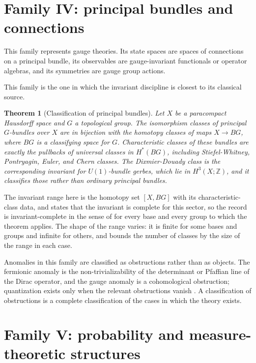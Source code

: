 \documentclass[11pt,letterpaper]{article}
\newtheorem{theorem}{Theorem}[section]
\theoremstyle{definition}
\theoremstyle{remark}
\begin{document}
\section{Family IV: principal bundles and connections}
\label{sec:family4}

This family represents gauge theories. Its state spaces are spaces of connections on a principal bundle, its observables are gauge-invariant functionals or operator algebras, and its symmetries are gauge group actions.

This family is the one in which the invariant discipline is closest to its classical source.

\begin{theorem}[Classification of principal bundles]
\label{thm:bundles}
Let $X$ be a paracompact Hausdorff space and $G$ a topological group. The isomorphism classes of principal $G$-bundles over $X$ are in bijection with the homotopy classes of maps $X \to BG$, where $BG$ is a classifying space for $G$. Characteristic classes of these bundles are exactly the pullbacks of universal classes in $H^*(BG)$, including Stiefel-Whitney, Pontryagin, Euler, and Chern classes. The Dixmier-Douady class is the corresponding invariant for $U(1)$-bundle gerbes, which lie in $H^3(X; \mathbb{Z})$, and it classifies those rather than ordinary principal bundles.
\end{theorem}

The invariant range here is the homotopy set $[X, BG]$ with its characteristic-class data, and  states that the invariant is complete for this sector, so the record is invariant-complete in the sense of  for every base and every group to which the theorem applies. The shape of the range varies: it is finite for some bases and groups and infinite for others, and  bounds the number of classes by the size of the range in each case.

Anomalies in this family are classified as obstructions rather than as objects. The fermionic anomaly is the non-trivializability of the determinant or Pfaffian line of the Dirac operator, and the gauge anomaly is a cohomological obstruction; quantization exists only when the relevant obstructions vanish \cite{anomaly}. A classification of obstructions is a complete classification of the cases in which the theory exists.

\section{Family V: probability and measure-theoretic structures}
\label{sec:family5}
\end{document}
